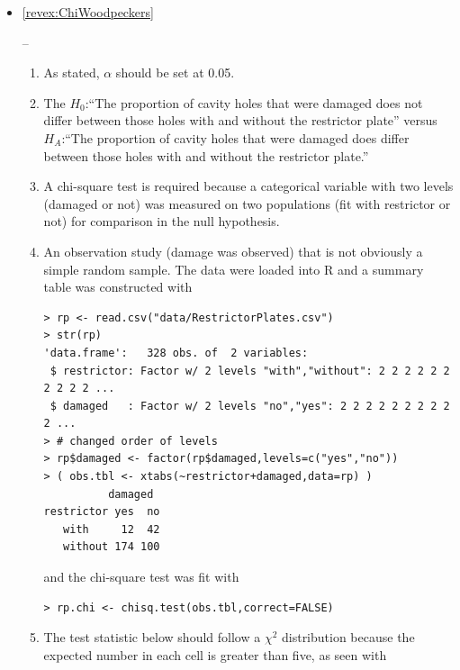 \documentclass[10pt,openany]{book}\usepackage[]{graphicx}\usepackage[]{color}
\makeatletter
\newenvironment{kframe}{%
 \def\at@end@of@kframe{}%
 \ifinner\ifhmode%
  \def\at@end@of@kframe{\end{minipage}}%
  \begin{minipage}{\columnwidth}%
 \fi\fi%
 \def\FrameCommand##1{\hskip\@totalleftmargin \hskip-\fboxsep
 \colorbox{shadecolor}{##1}\hskip-\fboxsep
     \hskip-\linewidth \hskip-\@totalleftmargin \hskip\columnwidth}%
 \MakeFramed {\advance\hsize-\width
   \@totalleftmargin\z@ \linewidth\hsize
   \@setminipage}}%
 {\par\unskip\endMakeFramed%
 \at@end@of@kframe}
\newenvironment{knitrout}{}{} %
\makeatother
\begin{document}
\begin{itemize}
  \item \hypertarget{ans:ChiWoodpeckers}{\ref{revex:ChiWoodpeckers}} --
    \begin{enumerate}
      \item As stated, $\alpha$ should be set at 0.05.
      \item The $H_{0}$:``The proportion of cavity holes that were damaged does not differ between those holes with and without the restrictor plate'' versus $H_{A}$:``The proportion of cavity holes that were damaged does differ between those holes with and without the restrictor plate.''
      \item A chi-square test is required because a categorical variable with two levels (damaged or not) was measured on two populations (fit with restrictor or not) for comparison in the null hypothesis.
      \item An observation study (damage was observed) that is not obviously a simple random sample.  The data were loaded into R and a summary table was constructed with
\begin{knitrout}
\color{fgcolor}\begin{kframe}
\begin{verbatim}
> rp <- read.csv("data/RestrictorPlates.csv")
> str(rp)
'data.frame':	328 obs. of  2 variables:
 $ restrictor: Factor w/ 2 levels "with","without": 2 2 2 2 2 2 2 2 2 2 ...
 $ damaged   : Factor w/ 2 levels "no","yes": 2 2 2 2 2 2 2 2 2 2 ...
> # changed order of levels
> rp$damaged <- factor(rp$damaged,levels=c("yes","no"))
> ( obs.tbl <- xtabs(~restrictor+damaged,data=rp) )
          damaged
restrictor yes  no
   with     12  42
   without 174 100
\end{verbatim}
\end{kframe}
\end{knitrout}
and the chi-square test was fit with
\begin{knitrout}
\color{fgcolor}\begin{kframe}
\begin{verbatim}
> rp.chi <- chisq.test(obs.tbl,correct=FALSE)
\end{verbatim}
\end{kframe}
\end{knitrout}
      \item The test statistic below should follow a $\chi^{2}$ distribution because the expected number in each cell is greater than five, as seen with
\begin{knitrout}

\end{knitrout}
\end{enumerate}
\end{itemize}
\end{document}
